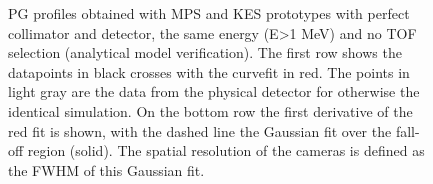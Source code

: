 \documentclass[a4paper,english,12pt]{article}
\begin{document}
\begin{figure}[!htp]
  \centering
  \quad
  \caption{\label{fig:PGprofileFairComp} PG profiles obtained with MPS and KES prototypes with perfect collimator and detector, the same energy (E>1 MeV) and no TOF selection (analytical model verification). The first row shows the datapoints in black crosses with the curvefit in red. The points in light gray are the data from the physical detector for otherwise the identical simulation. On the bottom row the first derivative of the red fit is shown, with the dashed line the Gaussian fit over the fall-off region (solid). The spatial resolution of the cameras is defined as the FWHM of this Gaussian fit.}
\end{figure}
\end{document}
